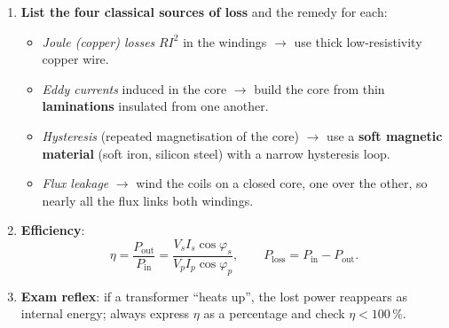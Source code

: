 \documentclass[11pt]{article}
\begin{document}
\begin{methode}
\begin{enumerate}
\item \textbf{List the four classical sources of loss} and the remedy for each:
\begin{itemize}
\item \emph{Joule (copper) losses} $RI^2$ in the windings $\rightarrow$ use thick low-resistivity copper wire.
\item \emph{Eddy currents} induced in the core $\rightarrow$ build the core from thin \textbf{laminations} insulated from one another.
\item \emph{Hysteresis} (repeated magnetisation of the core) $\rightarrow$ use a \textbf{soft magnetic material} (soft iron, silicon steel) with a narrow hysteresis loop.
\item \emph{Flux leakage} $\rightarrow$ wind the coils on a closed core, one over the other, so nearly all the flux links both windings.
\end{itemize}
\item \textbf{Efficiency}:
\[
\eta = \frac{P_{\text{out}}}{P_{\text{in}}} = \frac{V_s I_s \cos\varphi_s}{V_p I_p \cos\varphi_p}, \qquad
P_{\text{loss}} = P_{\text{in}} - P_{\text{out}}.
\]
\item \textbf{Exam reflex}: if a transformer ``heats up'', the lost power reappears as internal energy; always express $\eta$ as a percentage and check $\eta < 100\,\%$.
\end{enumerate}
\end{methode}
\end{document}
